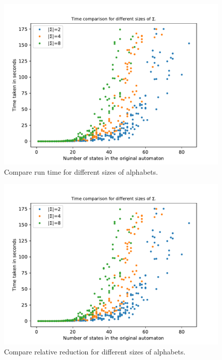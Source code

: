 \begin{figure}
	\centering
	\includegraphics[page=1,height=.3\textheight]{../data/analysis/everything/ap_time_comparison.pdf} 
	\caption{Compare run time for different sizes of alphabets.}
	\label{fig:everything:empirical_compare_time}
\end{figure}


\begin{figure}
	\centering
	\includegraphics[page=2,height=.3\textheight]{../data/analysis/everything/ap_time_comparison.pdf} 
	\caption{Compare relative reduction for different sizes of alphabets.}
	\label{fig:everything:empirical_compare_reduct}
\end{figure}